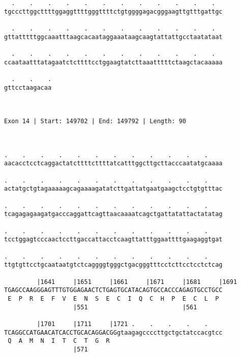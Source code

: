\documentclass{article}
\begin{document}
\begin{Verbatim}
  .    .    .    .    .    .    .    .    .    .    .    .  
tgcccttggcttttggaggttttgggttttctgtggggagacgggaagttgtttgattgc
                                                            
  .    .    .    .    .    .    .    .    .    .    .    .  
gttatttttggcaaatttaagcacaataggaaataagcaagtattattgcctaatataat
                                                            
  .    .    .    .    .    .    .    .    .    .    .    .  
ccaataatttatagaatctcttttcctggaagtatcttaaatttttctaagctacaaaaa
                                                            
  .    .    .
gttcctaagacaa
             
             
 
Exon 14 | Start: 149702 | End: 149792 | Length: 90



.    .    .    .    .    .    .    .    .    .    .    .    
aacacctcctcaggactatcttttcttttatcatttggcttgcttacccaatatgcaaaa
                                                            
.    .    .    .    .    .    .    .    .    .    .    .    
actatgctgtagaaaaagcagaaaagatatcttgattatgaatgaagctcctgtgtttac
                                                            
.    .    .    .    .    .    .    .    .    .    .    .    
tcagagagaagatgacccaggattcagttaacaaaatcagctgattatattactatatag
                                                            
.    .    .    .    .    .    .    .    .    .    .    .    
tcctggagtcccaactccttgaccattacctcaagttatttggaattttgaagaggtgat
                                                            
.    .    .    .    .    .    .    .    .    .    .    .    
ttgtgttcctgcaataatgtctcaggggtgggctgacgggtttcctcttcctcctctcag
                                                            
         |1641     |1651     |1661     |1671     |1681     |1691
TGAGCCAAGGGAGTTTGTGGAGAACTCTGAGTGCATACAGTGCCACCCAGAGTGCCTGCC
 E  P  R  E  F  V  E  N  S  E  C  I  Q  C  H  P  E  C  L  P 
                   |551                          |561       
  
         |1701     |1711     |1721 .    .    .    .    .    
TCAGGCCATGAACATCACCTGCACAGGACGGgtaagagccccttgctgctatccacgtcc
 Q  A  M  N  I  T  C  T  G  R                               
                   |571                                     
  

\end{Verbatim}
\end{document}
